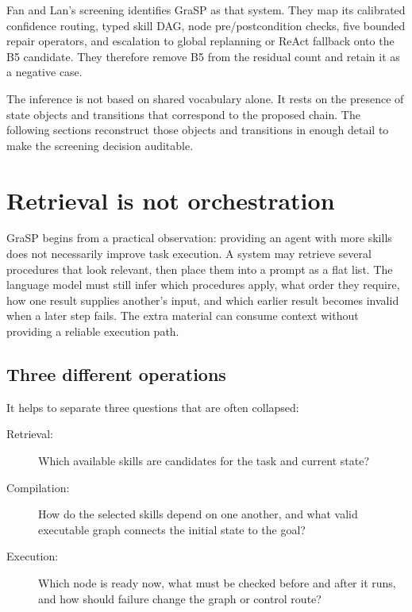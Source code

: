 Fan and Lan's screening identifies GraSP as that system. They map its calibrated confidence routing, typed skill DAG, node pre/postcondition checks, five bounded repair operators, and escalation to global replanning or ReAct fallback onto the B5 candidate. They therefore remove B5 from the residual count and retain it as a negative case.

The inference is not based on shared vocabulary alone. It rests on the presence of state objects and transitions that correspond to the proposed chain. The following sections reconstruct those objects and transitions in enough detail to make the screening decision auditable.

\section{Retrieval is not orchestration}
\label{sec:ch17-retrieval-not-orchestration}

GraSP begins from a practical observation: providing an agent with more skills does not necessarily improve task execution. A system may retrieve several procedures that look relevant, then place them into a prompt as a flat list. The language model must still infer which procedures apply, what order they require, how one result supplies another's input, and which earlier result becomes invalid when a later step fails. The extra material can consume context without providing a reliable execution path.\autocite{xia2026grasp}

\subsection{Three different operations}

It helps to separate three questions that are often collapsed:

\begin{description}
  \item[Retrieval:] Which available skills are candidates for the task and current state?
  \item[Compilation:] How do the selected skills depend on one another, and what valid executable graph connects the initial state to the goal?
  \item[Execution:] Which node is ready now, what must be checked before and after it runs, and how should failure change the graph or control route?
\end{description}

